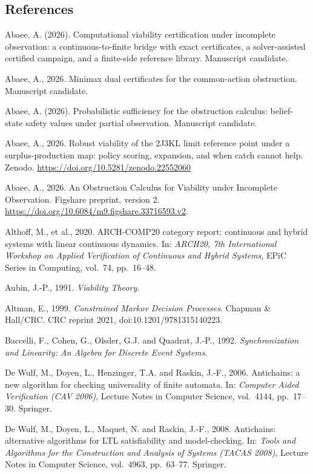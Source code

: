 \documentclass[10pt,twocolumn]{article}
\theoremstyle{plain}
\theoremstyle{definition}
\theoremstyle{remark}
\begin{document}
\subsection*{References}
\label{references}
Abaee, A. (2026). Computational viability certification under incomplete
observation: a continuous-to-finite bridge with exact certificates, a
solver-assisted certified campaign, and a finite-side reference library.
Manuscript candidate.

Abaee, A., 2026. Minimax dual certificates for the common-action
obstruction. Manuscript candidate.

Abaee, A. (2026). Probabilistic sufficiency for the obstruction calculus: belief-state safety values under partial observation. Manuscript candidate.

Abaee, A., 2026. Robust viability of the 2J3KL limit reference point
under a surplus-production map: policy scoring, expansion, and when
catch cannot help. Zenodo.
\url{https://doi.org/10.5281/zenodo.22552060}

Abaee, A., 2026. An Obstruction Calculus for Viability under Incomplete Observation. Figshare preprint, version 2. \url{https://doi.org/10.6084/m9.figshare.33716593.v2}.

Althoff, M., et al., 2020. ARCH-COMP20 category report: continuous and hybrid systems with
linear continuous dynamics. In: \emph{ARCH20, 7th International Workshop on Applied
Verification of Continuous and Hybrid Systems}, EPiC Series in Computing, vol.~74, pp.~16--48.

Aubin, J.-P., 1991. \emph{Viability Theory}.

Altman, E., 1999. \emph{Constrained Markov Decision Processes}. Chapman \& Hall/CRC. CRC
reprint 2021, doi:10.1201/9781315140223.

Baccelli, F., Cohen, G., Olsder, G.J. and Quadrat, J.-P., 1992. \emph{Synchronization and
Linearity: An Algebra for Discrete Event Systems}.


De Wulf, M., Doyen, L., Henzinger, T.A. and Raskin, J.-F., 2006. Antichains: a new
algorithm for checking universality of finite automata. In: \emph{Computer Aided
Verification (CAV 2006)}, Lecture Notes in Computer Science, vol.~4144, pp.~17--30.
Springer.

De Wulf, M., Doyen, L., Maquet, N. and Raskin, J.-F., 2008. Antichains: alternative
algorithms for LTL satisfiability and model-checking. In: \emph{Tools and Algorithms
for the Construction and Analysis of Systems (TACAS 2008)}, Lecture Notes in Computer
Science, vol.~4963, pp.~63--77. Springer.
\end{document}
